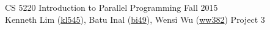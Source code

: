 \documentclass{scrartcl}
\begin{document}
  \begin{framed}
  CS 5220 Introduction to Parallel Programming \hfill Fall 2015 \\
  Kenneth Lim (\href{mailto:kl545@cornell.edu}{kl545}), Batu Inal (\href{mailto:bi49@cornell.edu}{bi49}), Wensi Wu (\href{mailto:ww382@cornell.edu}{ww382}) \hfill Project 3 \hspace{-3ex}
  \end{framed} 
\end{document}

